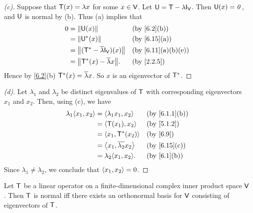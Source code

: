 \begin{proof}[(c)]
  Suppose that \(\mathsf{T}(x) = \lambda x\) for some \(x \in \mathsf{V}\).
  Let \(\U = \T - \lambda \IT[\V]\).
  Then \(\mathsf{U}(x) = \mathit{0}\), and \(\mathsf{U}\) is normal by (b).
  Thus (a) implies that
  \begin{align*}
    0 & = \norm{\U(x)}                              &  & \by{6.2}[b]      \\
      & = \norm{\U^*(x)}                            &  & \by{6.15}[a]     \\
      & = \norm{(\T^* - \conj{\lambda} \IT[\V])(x)} &  & \by{6.11}[a,b,e] \\
      & = \norm{\T^*(x) - \conj{\lambda} x}.        &  & \by{2.2.5}
  \end{align*}
  Hence by \cref{6.2}(b) \(\mathsf{T}^*(x) = \overline{\lambda} x\).
  So \(x\) is an eigenvector of \(\mathsf{T}^*\).
\end{proof}

\begin{proof}[(d)]
  Let \(\lambda_1\) and \(\lambda_2\) be distinct eigenvalues of \(\mathsf{T}\) with corresponding eigenvectors \(x_1\) and \(x_2\).
  Then, using (c), we have
  \begin{align*}
    \lambda_1 \inn{x_1, x_2} & = \inn{\lambda_1 x_1, x_2}        &  & \by{6.1.1}[b] \\
                             & = \inn{\T(x_1), x_2}              &  & \by{5.1.2}    \\
                             & = \inn{x_1, \T^*(x_2)}            &  & \by{6.9}      \\
                             & = \inn{x_1, \conj{\lambda_2} x_2} &  & \by{6.15}[c]  \\
                             & = \lambda_2 \inn{x_1, x_2}.       &  & \by{6.1}[b]
  \end{align*}
  Since \(\lambda_1 \neq \lambda_2\), we conclude that \(\left\langle x_1, x_2\right\rangle = 0\).
\end{proof}

\begin{thm}\label{6.16}
  Let \(\mathsf{T}\) be a linear operator on a finite-dimensional complex inner product space \(\mathsf{V}\).
  Then \(\mathsf{T}\) is normal iff there exists an orthonormal basis for \(\mathsf{V}\) consisting of eigenvectors of \(\mathsf{T}\).
\end{thm}

